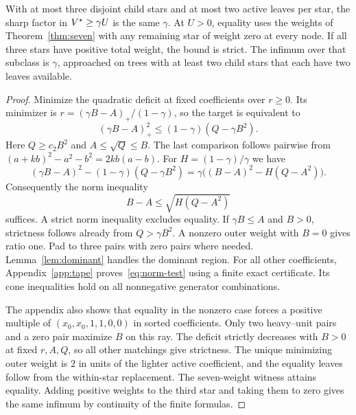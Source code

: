 \begin{theorem}\label{thm:three}
With at most three disjoint child stars and at most two active leaves
per star, the sharp factor in $V^\star\ge\gamma U$ is the same
$\gamma$. At $U>0$, equality uses the weights of
Theorem~\ref{thm:seven} with any remaining star of weight zero at every
node. If all three stars have positive total weight, the bound is
strict. The infimum over that subclass is $\gamma$, approached on
trees with at least two child stars that each have two leaves
available.
\end{theorem}
\begin{proof}
Minimize the quadratic deficit at fixed coefficients over $r\ge0$.
Its minimizer is $r=(\gamma B-A)_+/(1-\gamma)$, so the target is
equivalent to
\begin{equation}
 (\gamma B-A)_+^2\le(1-\gamma)(Q-\gamma B^2).
 \label{eq:deficit}
\end{equation}
Here $Q\ge c_2B^2$ and $A\le\sqrt Q\le B$. The last comparison
follows pairwise from $(a+kb)^2-a^2-b^2=2kb(a-b)$. For
$H=(1-\gamma)/\gamma$ we have
\[
 (\gamma B-A)^2-(1-\gamma)(Q-\gamma B^2)
 =\gamma\bigl((B-A)^2-H(Q-A^2)\bigr).
\]
Consequently the norm inequality
\begin{equation}
 B-A\le\sqrt{H(Q-A^2)}
 \label{eq:norm-test}
\end{equation}
suffices. A strict norm inequality excludes equality.
If $\gamma B\le A$ and $B>0$, strictness follows already from
$Q>\gamma B^2$. A nonzero outer weight with $B=0$ gives ratio one.
Pad to three pairs with zero pairs where needed. Lemma~\ref{lem:dominant}
handles the dominant region. For all other coefficients,
Appendix~\ref{app:tape} proves~\eqref{eq:norm-test} using a finite
exact certificate. Its cone inequalities hold on
all nonnegative generator combinations.

The appendix also shows that equality in the nonzero case forces a
positive multiple of $(x_0,x_0,1,1,0,0)$ in sorted coefficients.
Only two heavy--unit pairs and a zero pair maximize $B$ on this
ray. The deficit strictly decreases with $B>0$ at fixed $r,A,Q$,
so all other matchings give strictness. The unique minimizing
outer weight is $2$ in units of the lighter active coefficient,
and the equality leaves follow from the within-star replacement.
The seven-weight witness attains equality. Adding positive weights
to the third star and taking them to zero gives the same infimum
by continuity of the finite formulas.
\end{proof}
